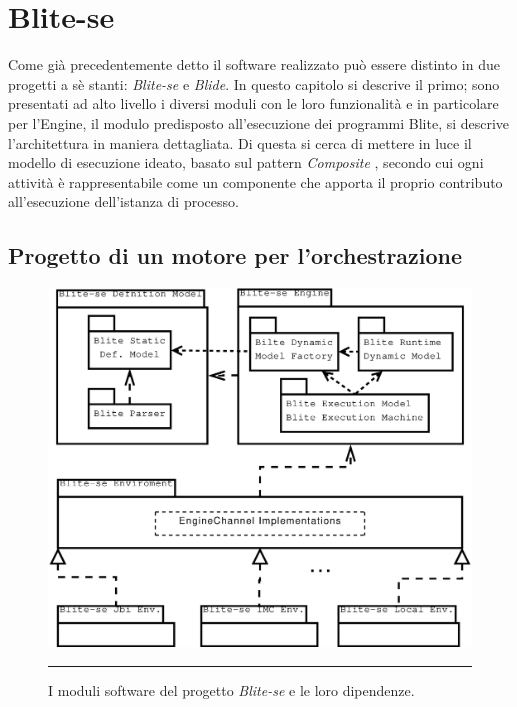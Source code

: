 \chapter{Blite-se}

Come già precedentemente detto il software realizzato può essere distinto
in due progetti a sè stanti: \emph{Blite-se} e \emph{Blide}. In questo capitolo
si descrive il primo; sono presentati ad alto livello i diversi
moduli con le loro funzionalità e in particolare per l'Engine, il modulo predisposto all'esecuzione dei programmi
Blite, si descrive l'architettura in maniera dettagliata. Di questa si cerca di
mettere in luce il modello di esecuzione ideato, basato sul pattern
\emph{Composite} \cite{GANGo4}, secondo cui ogni attività è rappresentabile
come un componente che apporta il proprio contributo all'esecuzione dell'istanza di processo.

\section{Progetto di un motore per l'orchestrazione}

\begin{figure}[t]
\begin{center}
\includegraphics[scale=0.50]
{architettura_interna/dia/BliteModule}
\caption[I moduli di Blite-se] {I moduli software del progetto \emph{Blite-se}
e le loro dipendenze.}
\rule{7cm}{0.01cm}
  \label{fig:modules}
\end{center}
\end{figure}

